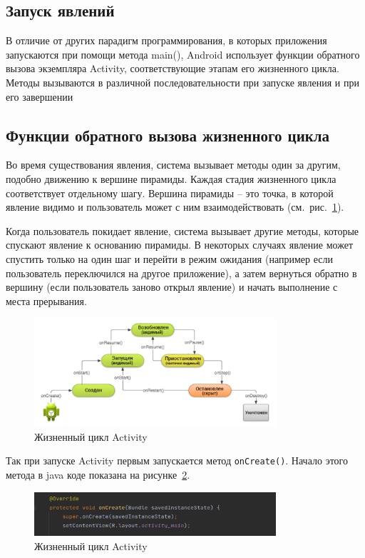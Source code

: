 \subsection{Запуск явлений}
В отличие от других парадигм программирования, в которых приложения
запускаются при помощи метода main(), Android использует функции
обратного вызова экземпляра Activity, соответствующие этапам его
жизненного цикла. Методы вызываются в различной последовательности при
запуске явления и при его завершении

\subsection{Функции обратного вызова жизненного цикла}
Во время существования явления, система вызывает методы один за другим,
подобно движению к вершине пирамиды. Каждая стадия жизненного цикла
соответствует отдельному шагу. Вершина пирамиды – это точка, в которой
явление видимо и пользователь может с ним взаимодействовать
(см.~рис.~\ref{fig:activity:ll}).\par
Когда пользователь покидает явление, система вызывает другие методы,
которые спускают явление к основанию пирамиды. В некоторых случаях
явление может спустить только на один шаг и перейти в режим ожидания
(например если пользователь переключился на другое приложение), а затем
вернуться обратно в вершину (если пользователь заново открыл явление) и
начать выполнение с места прерывания.
\begin{figure}[h!tp]
	\centering
	\includegraphics[width=0.8\textwidth]{Screenshot from 2023-02-21 10-58-53.png}
	\caption{Жизненный цикл Activity}
	\label{fig:activity:ll}
\end{figure}

Так при запуске Activity первым запускается метод \texttt{onCreate()}.
Начало этого метода в java коде показана
на рисунке~\ref{fig:activity:onCreate}.
\begin{figure}[h!tp]
	\centering
	\includegraphics[width=0.8\textwidth]{Screenshot from 2023-02-21 11-02-22.png}
	\caption{Жизненный цикл Activity}
	\label{fig:activity:onCreate}
\end{figure}

